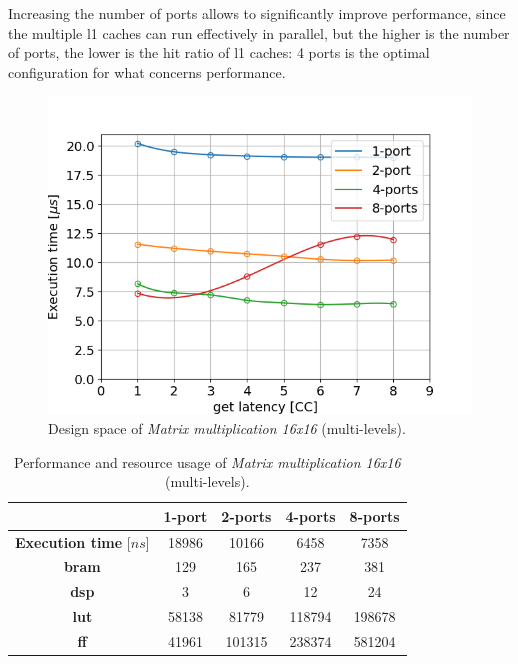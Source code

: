 \documentclass[11pt,a4paper,oneside]{memoir}
\begin{document}
Increasing the number of ports allows to significantly improve performance,
since the multiple \ac{l1} caches can run effectively in parallel, but the
higher is the number of ports, the lower is the hit ratio of \ac{l1} caches: 4
ports is the optimal configuration for what concerns performance.

\begin{figure}[H]
	\centering
	\includegraphics[width=.8\textwidth]{matmul_16_multiport_L1_latency}
	\caption{Design space of \emph{Matrix multiplication 16x16}
	(multi-levels).}
	\label{fig:matmul_16_l1_space}
\end{figure}

\begin{table}[H]
	\begin{center}
		\begin{tabular}{ccccc}
			\hline
			\rowcolor{gray!50}
			& \textbf{1-port} & \textbf{2-ports} & \textbf{4-ports}
			& \textbf{8-ports} \\
			\hline
			\textbf{Execution time} [$ns$] & 18986 & 10166 & 6458 &
			7358 \\
			\rowcolor{gray!25}
			\textbf{\ac{bram}} & 129 & 165 & 237 & 381 \\
			\textbf{\acs{dsp}} & 3 & 6 & 12 & 24 \\
			\rowcolor{gray!25}
			\textbf{\acs{lut}} & 58138 & 81779 & 118794 & 198678 \\
			\textbf{\acs{ff}} & 41961 & 101315 & 238374 & 581204 \\
			\hline
		\end{tabular}
	\end{center}
	\caption{Performance and resource usage of \emph{Matrix multiplication
	16x16} (multi-levels).}
	\label{tab:matmul_16_l1_ports_report}
\end{table}
\end{document}
